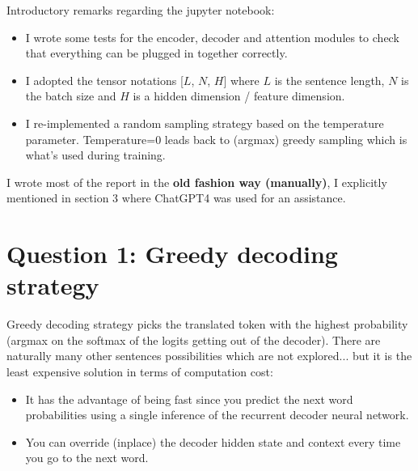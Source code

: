 \documentclass[a4paper]{article}
\begin{document}


Introductory remarks regarding the jupyter notebook:
\begin{itemize}
    \item I wrote some tests for the encoder, decoder and attention modules to check that everything can be plugged in together correctly.
    \item I adopted the tensor notations [$L$, $N$, $H$] where $L$ is the sentence length, $N$ is the batch size and $H$ is a hidden dimension / feature dimension.
    \item I re-implemented a random sampling strategy based on the temperature parameter. Temperature=0 leads back to (argmax) greedy sampling which is what's used during training.
\end{itemize}

I wrote most of the report in the \textbf{old fashion way (manually)}, I explicitly mentioned in section 3 where ChatGPT4 was used for an assistance.

\section{Question 1: Greedy decoding strategy}

Greedy decoding strategy picks the translated token with the highest probability (argmax on the softmax of the logits getting out of the decoder).
There are naturally many other sentences possibilities which are not explored... but it is the least expensive solution in terms of computation cost:
\begin{itemize}
    \item It has the advantage of being fast since you predict the next word probabilities using a single inference of the recurrent decoder neural network.
    \item You can override (inplace) the decoder hidden state and context every time you go to the next word. 
\end{itemize}
\end{document}
